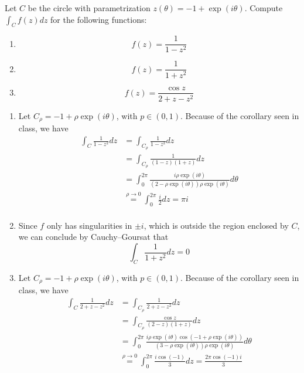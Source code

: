 \documentclass{article}
\renewcommand{\exp}[1]{\operatorname{exp}\left(#1\right)}
\begin{document}
    \begin{tcolorbox}[title=Exercise 7]
        Let $C$ be the circle with parametrization $z(\theta) = -1 + \exp{i\theta}$. Compute $\int_C{f(z)dz}$ for the following functions:
        \begin{enumerate}[label=(\alph*)]
            \item \begin{equation*}
                f(z) = \frac{1}{1 - z^2}
            \end{equation*}
            \item \begin{equation*}
                f(z) = \frac{1}{1 + z^2}
            \end{equation*}
            \item \begin{equation*}
                f(z) = \frac{\cos{z}}{2 + z - z^2}
            \end{equation*}
        \end{enumerate}
    \end{tcolorbox}
    
    \begin{enumerate}[label=(\alph*)]
        \item Let $C_\rho = -1 + \rho\exp{i\theta}$, with $p \in (0, 1)$. Because of the corollary seen in class, we have
        \begin{align*}
            \int_C \frac{1}{1 - z^2}dz &= \int_{C_\rho} \frac{1}{1 - z^2}dz \\
            &= \int_{C_\rho} \frac{1}{(1 - z)(1 + z)}dz \\
            &= \int_0^{2\pi} \frac{i\rho\exp{i\theta}}{(2 - \rho\exp{i\theta})\rho\exp{i\theta}}d\theta \\
            &\overset{\rho \to 0}{=} \int_0^{2\pi} \frac{i}{2}dz = \pi i \\
        \end{align*}
        \item Since $f$ only has singularities in $\pm i$, which is outside the region enclosed by $C$, we can conclude by Cauchy–Goursat that
        \begin{equation*}
            \int_C \frac{1}{1 + z^2}dz = 0
        \end{equation*}
        \item Let $C_\rho = -1 + \rho\exp{i\theta}$, with $p \in (0, 1)$. Because of the corollary seen in class, we have
        \begin{align*}
            \int_C \frac{1}{2 + z - z^2}dz &= \int_{C_\rho} \frac{1}{2 + z - z^2}dz \\
            &= \int_{C_\rho} \frac{\cos{z}}{(2 - z)(1 + z)}dz \\
            &= \int_0^{2\pi} \frac{i\rho\exp{i\theta}\cos(-1 + \rho\exp{i\theta})}{(3 - \rho\exp{i\theta})\rho\exp{i\theta}}d\theta \\
            &\overset{\rho \to 0}{=} \int_0^{2\pi} \frac{i\cos(-1)}{3}dz = \frac{2\pi\cos(-1)i}{3} \\
        \end{align*}
    \end{enumerate}
\end{document}
